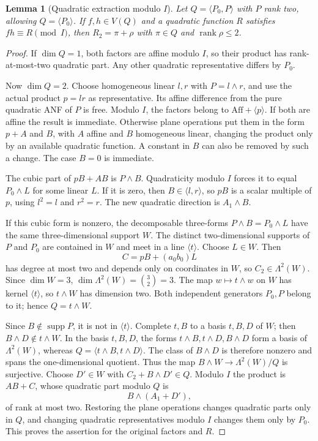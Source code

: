 \documentclass[11pt,a4paper]{article}
\theoremstyle{plain}
\newtheorem{lemma}[theorem]{Lemma}
\theoremstyle{remark}
\newcommand{\Aff}{\mathrm{Aff}}
\newcommand{\supp}{\operatorname{supp}}
\newcommand{\rk}{\operatorname{rank}}
\begin{document}
\begin{lemma}[Quadratic extraction modulo $I$]\label{l2:lem:ideal}
Let $Q=\langle P_0,P\rangle$ with $P$ rank two, allowing $Q=\langle P_0\rangle$. If $f,h\in V(Q)$ and a quadratic function $R$ satisfies $fh\equiv R\pmod I$, then $R_2=\pi+\rho$ with $\pi\in Q$ and $\rk\rho\le2$.
\end{lemma}
\begin{proof}
If $\dim Q=1$, both factors are affine modulo $I$, so their product has rank-at-most-two quadratic part. Any other quadratic representative differs by $P_0$.

Now $\dim Q=2$. Choose homogeneous linear $l,r$ with $P=l\wedge r$, and use the actual product $p=lr$ as representative. Its affine difference from the pure quadratic ANF of $P$ is free. Modulo $I$, the factors belong to $\Aff+\langle p\rangle$. If both are affine the result is immediate. Otherwise plane operations put them in the form $p+A$ and $B$, with $A$ affine and $B$ homogeneous linear, changing the product only by an available quadratic function. A constant in $B$ can also be removed by such a change. The case $B=0$ is immediate.

The cubic part of $pB+AB$ is $P\wedge B$. Quadraticity modulo $I$ forces it to equal $P_0\wedge L$ for some linear $L$. If it is zero, then $B\in\langle l,r\rangle$, so $pB$ is a scalar multiple of $p$, using $l^2=l$ and $r^2=r$. The new quadratic direction is $A_1\wedge B$.

If this cubic form is nonzero, the decomposable three-forms $P\wedge B=P_0\wedge L$ have the same three-dimensional support $W$. The distinct two-dimensional supports of $P$ and $P_0$ are contained in $W$ and meet in a line $\langle t\rangle$. Choose $L\in W$. Then
\[
C=pB+(a_0b_0)L
\]
has degree at most two and depends only on coordinates in $W$, so $C_2\in\Lambda^2(W)$. Since $\dim W=3$, $\dim\Lambda^2(W)=\binom32=3$. The map $w\mapsto t\wedge w$ on $W$ has kernel $\langle t\rangle$, so $t\wedge W$ has dimension two. Both independent generators $P_0,P$ belong to it; hence $Q=t\wedge W$.

Since $B\notin\supp P$, it is not in $\langle t\rangle$. Complete $t,B$ to a basis $t,B,D$ of $W$; then $B\wedge D\notin t\wedge W$. In the basis $t,B,D$, the forms $t\wedge B,t\wedge D,B\wedge D$ form a basis of $\Lambda^2(W)$, whereas $Q=\langle t\wedge B,t\wedge D\rangle$. The class of $B\wedge D$ is therefore nonzero and spans the one-dimensional quotient. Thus the map $B\wedge W\to\Lambda^2(W)/Q$ is surjective. Choose $D'\in W$ with $C_2+B\wedge D'\in Q$. Modulo $I$ the product is $AB+C$, whose quadratic part modulo $Q$ is
\[
B\wedge(A_1+D'),
\]
of rank at most two. Restoring the plane operations changes quadratic parts only in $Q$, and changing quadratic representatives modulo $I$ changes them only by $P_0$. This proves the assertion for the original factors and $R$.
\end{proof}
\end{document}
